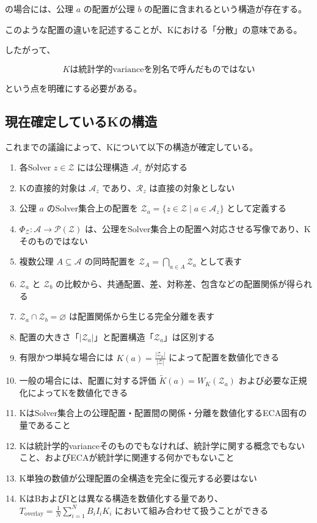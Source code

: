 の場合には、公理 $a$ の配置が公理 $b$ の配置に含まれるという構造が存在する。

このような配置の違いを記述することが、Kにおける「分散」の意味である。

したがって、

\[
\boxed{
K\text{は統計学的varianceを別名で呼んだものではない}
}
\]

という点を明確にする必要がある。

\subsection{現在確定しているKの構造}

これまでの議論によって、Kについて以下の構造が確定している。

\begin{enumerate}
  \item 各Solver $z\in\mathcal{Z}$ には公理構造 $\mathcal{A}_z$ が対応する
  \item Kの直接的対象は $\mathcal{A}_z$ であり、$\mathcal{R}_z$ は直接の対象としない
  \item 公理 $a$ のSolver集合上の配置を $\mathcal{Z}_a = \{z\in\mathcal{Z}\mid a\in\mathcal{A}_z\}$ として定義する
  \item $\Phi_{\mathcal{Z}}:\mathcal{A}\to\mathcal{P}(\mathcal{Z})$ は、公理をSolver集合上の配置へ対応させる写像であり、Kそのものではない
  \item 複数公理 $A\subseteq\mathcal{A}$ の同時配置を $\mathcal{Z}_A = \bigcap_{a\in A}\mathcal{Z}_a$ として表す
  \item $\mathcal{Z}_a$ と $\mathcal{Z}_b$ の比較から、共通配置、差、対称差、包含などの配置関係が得られる
  \item $\mathcal{Z}_a\cap\mathcal{Z}_b=\varnothing$ は配置関係から生じる完全分離を表す
  \item 配置の大きさ「$|\mathcal{Z}_a|$」と配置構造「$\mathcal{Z}_a$」は区別する
  \item 有限かつ単純な場合には $K(a)=\frac{|\mathcal{Z}_a|}{|\mathcal{Z}|}$ によって配置を数値化できる
  \item 一般の場合には、配置に対する評価 $\widetilde{K}(a)=W_K(\mathcal{Z}_a)$ および必要な正規化によってKを数値化できる
  \item KはSolver集合上の公理配置・配置間の関係・分離を数値化するECA固有の量であること
  \item Kは統計学的varianceそのものでもなければ、統計学に関する概念でもないこと、およびECAが統計学に関連する何かでもないこと
  \item K単独の数値が公理配置の全構造を完全に復元する必要はない
  \item KはBおよびIとは異なる構造を数値化する量であり、$T_{\mathrm{overlay}} = \frac{1}{N}\sum_{i=1}^{N}B_iI_iK_i$ において組み合わせて扱うことができる
\end{enumerate}

